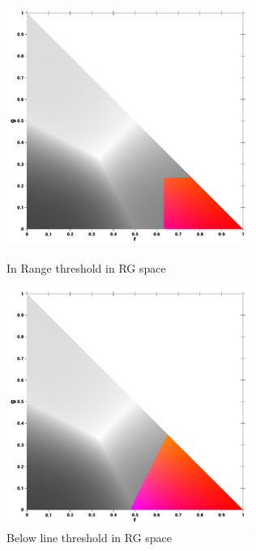 {	\begin{figure}[H]
		\begin{minipage}[b]{0.49\textwidth}
		\centering
		\includegraphics[width=1\linewidth]{figure/Analysis/inrangethresholdcolor.png}
		\caption{In Range threshold in RG space}
		\label{thresholdintrange}
	
	\end{minipage}
	\hfill
	\begin{minipage}[b]{0.49\textwidth}

		\includegraphics[width=1\linewidth]{figure/Analysis/belowlinethresholdthresholdcolor.png}
		\caption{Below line threshold in RG space}
		\label{fig:thresholdbelowline}
	\end{minipage}
	\end{figure}
	


}
